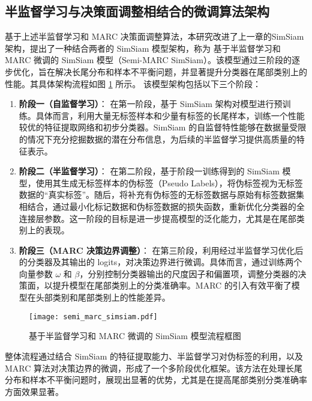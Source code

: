 \documentclass[master]{thesis-uestc}
\begin{document}
\subsection{半监督学习与决策面调整相结合的微调算法架构}

基于上述半监督学习和 MARC 决策面调整算法，本研究改进了上一章的SimSiam架构，提出了一种结合两者的 SimSiam 模型架构，称为 基于半监督学习和 MARC 微调的 SimSiam 模型（Semi-MARC SimSiam）。该模型通过三阶段的逐步优化，旨在解决长尾分布和样本不平衡问题，并显著提升分类器在尾部类别上的性能。其具体架构流程如图 \ref{semi_marc_simsiam} 所示。
该模型架构包括以下三个阶段：

\begin{enumerate}[label={(\arabic*)}]
    \item \textbf{阶段一（自监督学习）}：  
    在第一阶段，基于 SimSiam 架构对模型进行预训练。具体而言，利用大量无标签样本和少量有标签的长尾样本，训练一个性能较优的特征提取网络和初步分类器。SimSiam 的自监督特性能够在数据量受限的情况下充分挖掘数据的潜在分布信息，为后续的半监督学习提供高质量的特征表示。

    \item \textbf{阶段二（半监督学习）}：  
    在第二阶段，基于阶段一训练得到的 SimSiam 模型，使用其生成无标签样本的伪标签（Pseudo Labels），将伪标签视为无标签数据的“真实标签”。随后，将补充有伪标签的无标签数据与原始有标签数据集相结合，通过最小化标记数据和伪标签数据的损失函数，重新优化分类器的全连接层参数。这一阶段的目标是进一步提高模型的泛化能力，尤其是在尾部类别上的表现。

    \item \textbf{阶段三（MARC 决策边界调整）}：  
    在第三阶段，利用经过半监督学习优化后的分类器及其输出的 logits，对决策边界进行微调。具体而言，通过训练两个向量参数 $\omega$ 和 $\beta$，分别控制分类器输出的尺度因子和偏置项，调整分类器的决策面，以提升模型在尾部类别上的分类准确率。MARC 的引入有效平衡了模型在头部类别和尾部类别上的性能差异。
\end{enumerate}

\begin{figure}[h]
    \centering
    \texttt{[image: semi\_marc\_simsiam.pdf]}
    \caption{基于半监督学习和 MARC 微调的 SimSiam 模型流程框图}
    \label{semi_marc_simsiam}
\end{figure}

整体流程通过结合 SimSiam 的特征提取能力、半监督学习对伪标签的利用，以及 MARC 算法对决策边界的微调，形成了一个多阶段优化框架。该方法在处理长尾分布和样本不平衡问题时，展现出显著的优势，尤其是在提高尾部类别分类准确率方面效果显著。
\end{document}
